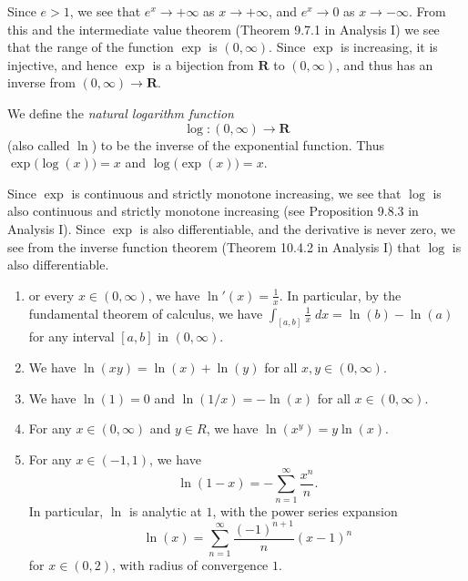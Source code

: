 \begin{note}
    Since \(e > 1\), we see that \(e^x \to +\infty\) as \(x \to +\infty\), and \(e^x \to 0\) as \(x \to -\infty\).
    From this and the intermediate value theorem (Theorem 9.7.1 in Analysis I) we see that the range of the function \(\exp\) is \((0, \infty)\).
    Since \(\exp\) is increasing, it is injective, and hence \(\exp\) is a bijection from \(\mathbf{R}\) to \((0, \infty)\), and thus has an inverse from \((0, \infty) \to \mathbf{R}\).
\end{note}

\begin{definition}[Logarithm]\label{4.5.5}
    We define the \emph{natural logarithm function}
    \[
        \log : (0, \infty) \to \mathbf{R}
    \]
    (also called \(\ln\)) to be the inverse of the exponential function.
    Thus \(\exp\big(\log(x)\big) = x\) and \(\log\big(\exp(x)\big) = x\).
\end{definition}

\begin{note}
    Since \(\exp\) is continuous and strictly monotone increasing, we see that \(\log\) is also continuous and strictly monotone increasing (see Proposition 9.8.3 in Analysis I).
    Since \(\exp\) is also differentiable, and the derivative is never zero, we see from the inverse function theorem (Theorem 10.4.2 in Analysis I) that \(\log\) is also differentiable.
\end{note}

\begin{theorem}\label{4.5.6}
    \quad
    \begin{enumerate}
        \item or every \(x \in (0, \infty)\), we have \(\ln'(x) = \frac{1}{x}\).
              In particular, by the fundamental theorem of calculus, we have \(\int_{[a, b]} \frac{1}{x} \; dx = \ln(b) - \ln(a)\) for any interval \([a, b]\) in \((0, \infty)\).
        \item We have \(\ln(xy) = \ln(x) + \ln(y)\) for all \(x, y \in (0, \infty)\).
        \item We have \(\ln(1) = 0\) and \(\ln(1 / x) = -\ln(x)\) for all \(x \in (0, \infty)\).
        \item For any \(x \in (0, \infty)\) and \(y \in R\), we have \(\ln(x^y) = y \ln(x)\).
        \item For any \(x \in (-1, 1)\), we have
              \[
                  \ln(1 - x) = - \sum_{n = 1}^\infty \frac{x^n}{n}.
              \]
              In particular, \(\ln\) is analytic at \(1\), with the power series expansion
              \[
                  \ln(x) = \sum_{n = 1}^\infty \frac{(-1)^{n + 1}}{n} (x - 1)^n
              \]
              for \(x \in (0, 2)\), with radius of convergence \(1\).
    \end{enumerate}
\end{theorem}

